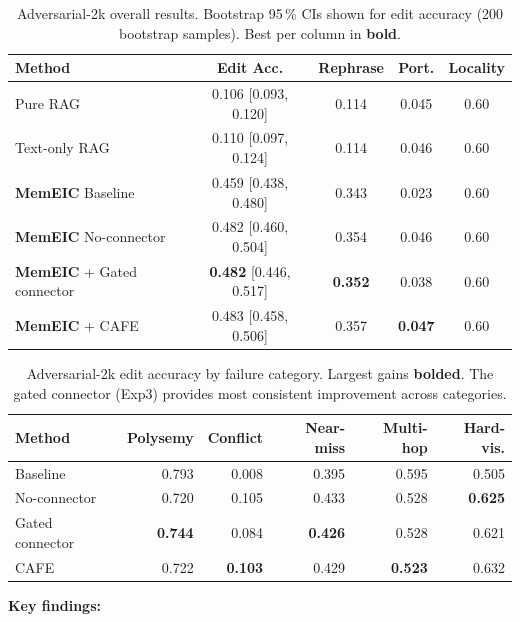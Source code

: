 \documentclass[11pt]{article}
\newcommand{\memeic}{\textbf{MemEIC}}
\newcommand{\best}[1]{\textcolor{memgreen}{\textbf{#1}}}
\begin{document}
\begin{table}[t]
\centering
\caption{Adversarial-2k overall results. Bootstrap 95\,\% CIs shown for edit
accuracy (200 bootstrap samples). Best per column in \textbf{bold}.}
\label{tab:adv2k_main}
\small
\begin{tabular}{@{}lcccc@{}}
\toprule
\textbf{Method} & \textbf{Edit Acc.} & \textbf{Rephrase} & \textbf{Port.} & \textbf{Locality} \\
\midrule
Pure RAG                   & 0.106 \small{[0.093, 0.120]} & 0.114 & 0.045 & 0.60 \\
Text-only RAG              & 0.110 \small{[0.097, 0.124]} & 0.114 & 0.046 & 0.60 \\
\memeic{} Baseline         & 0.459 \small{[0.438, 0.480]} & 0.343 & 0.023 & 0.60 \\
\memeic{} No-connector     & 0.482 \small{[0.460, 0.504]} & 0.354 & 0.046 & 0.60 \\
\memeic{} + Gated connector& \best{0.482} \small{[0.446, 0.517]} & \best{0.352} & 0.038 & 0.60 \\
\memeic{} + CAFE           & 0.483 \small{[0.458, 0.506]} & 0.357 & \best{0.047} & 0.60 \\
\bottomrule
\end{tabular}
\end{table}

\begin{table}[t]
\centering
\caption{Adversarial-2k edit accuracy by failure category. Largest gains
\textbf{bolded}. The gated connector (Exp3) provides most consistent
improvement across categories.}
\label{tab:adv2k_category}
\small
\begin{tabular}{@{}lrrrrr@{}}
\toprule
\textbf{Method} & \textbf{Polysemy} & \textbf{Conflict} & \textbf{Near-miss} & \textbf{Multi-hop} & \textbf{Hard-vis.} \\
\midrule
Baseline         & 0.793 & 0.008 & 0.395 & 0.595 & 0.505 \\
No-connector     & 0.720 & 0.105 & 0.433 & 0.528 & \textbf{0.625} \\
Gated connector  & \textbf{0.744} & 0.084 & \textbf{0.426} & 0.528 & 0.621 \\
CAFE             & 0.722 & \textbf{0.103} & 0.429 & \textbf{0.523} & 0.632 \\
\bottomrule
\end{tabular}
\end{table}

\textbf{Key findings:}
\end{document}
